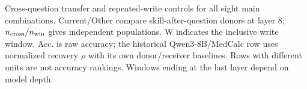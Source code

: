 \begin{table}[tbp]
\caption{Cross-question transfer and repeated-write controls for all eight main
combinations. Current/Other compare skill-after-question donors at layer 8;
$n_{\rm cross}/n_{\rm win}$ gives independent populations. W indicates the inclusive
write window. Acc. is raw accuracy; the historical Qwen3-8B/MedCalc row uses
normalized recovery $\rho$ with its own donor/receiver baselines.
Rows with different units are not accuracy rankings. Windows ending at the last
layer depend on model depth.}
\label{tab:fullscale}
\centering
\setlength{\tabcolsep}{2pt}

\end{table}
